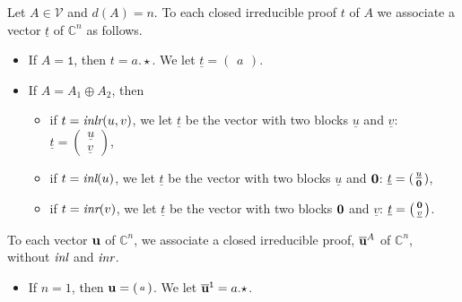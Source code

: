 \documentclass[screen, sigconf,authorversion,nonacm]{acmart}
\theoremstyle{acmdefinition}
\numberwithin{equation}{section}
\newcommand\inl{\mbox{\it inl}}
\newcommand\inr{\mbox{\it inr}}
\newcommand\inlr{\mbox{\it inlr}}
\newcommand\one{\ensuremath{\mathtt 1}}
\begin{document}
\begin{definition}[Correspondance]
Let $A \in \mathcal{V}$ and $d(A) = n$.  To each closed irreducible
proof $t$ of $A$ we associate a vector $\underline{t}$ of ${\mathbb
  C}^n$ as follows.
\begin{itemize}
\item If $A = \one$, then $t = a.\star$. We let $\underline{t} =
\left(\begin{smallmatrix} a \end{smallmatrix}\right)$.

\item If $A = A_1 \oplus A_2$, then

\begin{itemize}
    \item if $t = \inlr(u,v)$, we let $\underline{t}$ be the vector
      with two blocks $\underline{u}$ and $\underline{v}$:
      $\underline{t} = \left(\begin{smallmatrix}
        \underline{u}\\\underline{v} \end{smallmatrix}\right)$,

    \item if $t = \inl(u)$, we let $\underline{t}$ be the vector with
      two blocks $\underline{u}$ and ${\bf 0}$: $\underline{t} =
      \left(\begin{smallmatrix} \underline{u}\\{\bf
          0} \end{smallmatrix}\right)$,


    \item if $t = \inr(v)$, we let $\underline{t}$ be the vector with
      two blocks ${\bf 0}$ and $\underline{v}$: $\underline{t} =
      \left(\begin{smallmatrix} {\bf
          0}\\\underline{v} \end{smallmatrix}\right)$.
\end{itemize}
\end{itemize}

To each vector ${\bf u}$ of ${\mathbb C}^n$, we associate a closed
irreducible proof, $\overline{\bf u}^A$ of ${\mathbb C}^n$, without
$\inl$ and $\inr$.

\begin{itemize}
\item If $n = 1$, then ${\bf u} =
  \left(\begin{smallmatrix} a \end{smallmatrix}\right)$.
  We let $\overline{\bf u}^{\one} = a.\star$.


\end{itemize}
\end{definition}
\end{document}
